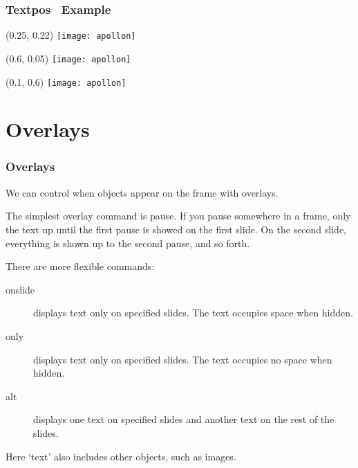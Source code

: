 \documentclass[UKenglish, unknownkeysallowed]{beamer}
\begin{document}
\begin{frame}
    \frametitle{Textpos \textthreequartersemdash\ Example}

    \begin{textblock}{0.3}(0.25, 0.22)
        \texttt{[image: apollon]}
    \end{textblock}

    \begin{textblock}{0.3}(0.6, 0.05)
        \texttt{[image: apollon]}
    \end{textblock}

    \begin{textblock}{0.2}(0.1, 0.6)
        \texttt{[image: apollon]}
    \end{textblock}
\end{frame}


\section{Overlays}


\begin{frame}
    \frametitle{Overlays}

    We can control when objects appear on the frame with \alert{overlays}.

    \pause
    \medskip

    The simplest overlay command is \alert{pause}.
    If you pause somewhere in a frame,
    only the text up until the first pause is showed on the first slide.
    On the second slide, everything is shown up to the second pause, and so forth.

    \pause
    \medskip
    There are more flexible commands:

    \begin{description}
        \item[onslide]
        displays text only on specified slides.
        The text occupies space when hidden.

        \item[only]
        displays text only on specified slides.
        The text occupies no space when hidden.

        \item[alt]
        displays one text on specified slides and another text on the rest of the slides.
    \end{description}

    Here `text' also includes other objects, such as images.
\end{frame}
\end{document}
